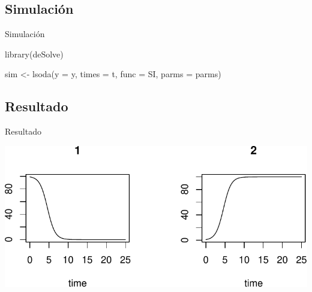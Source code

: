 \documentclass[
  11pt,
  ignorenonframetext,
]{beamer}
\newenvironment{Shaded}{}{}
\newcommand{\AttributeTok}[1]{\textcolor[rgb]{0.49,0.56,0.16}{#1}}
\newcommand{\FunctionTok}[1]{\textcolor[rgb]{0.02,0.16,0.49}{#1}}
\newcommand{\NormalTok}[1]{#1}
\newcommand{\OtherTok}[1]{\textcolor[rgb]{0.00,0.44,0.13}{#1}}
\begin{document}
\hypertarget{simulaciuxf3n}{%
\subsection{Simulación}\label{simulaciuxf3n}}

\begin{frame}[fragile]{Simulación}
\begin{Shaded}
\begin{Highlighting}[]
\FunctionTok{library}\NormalTok{(deSolve)}

\NormalTok{sim }\OtherTok{\textless{}{-}} \FunctionTok{lsoda}\NormalTok{(}\AttributeTok{y =}\NormalTok{ y, }\AttributeTok{times =}\NormalTok{ t, }
             \AttributeTok{func =}\NormalTok{ SI, }\AttributeTok{parms =}\NormalTok{ parms)}
\end{Highlighting}
\end{Shaded}
\end{frame}

\hypertarget{resultado}{%
\subsection{Resultado}\label{resultado}}

\begin{frame}{Resultado}
\begin{center}\includegraphics{Simulacion-epi_files/figure-beamer/unnamed-chunk-4-1} \end{center}
\end{frame}
\end{document}
